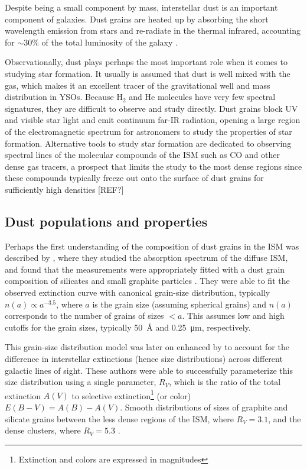 Despite being a small component by mass, interstellar dust is an important component of galaxies. Dust grains are heated up by absorbing the short wavelength emission from stars and re-radiate in the thermal infrared, accounting for $\sim 30\%$ of the total luminosity of the galaxy \citep{Mathis:1990jk}. 

Observationally, dust plays perhaps the most important role when it comes to studying star formation. It usually is assumed that dust is well mixed with the gas, which makes it an excellent tracer of the gravitational well and mass distribution in YSOs. Because H$_2$ and He molecules have very few spectral signatures, they are difficult to observe and study directly. Dust grains block UV and visible star light and emit continuum far-IR radiation, opening a large region of the electromagnetic spectrum for astronomers to study the properties of star formation. Alternative tools to study star formation are dedicated to observing spectral lines of the molecular compounds of the ISM such as CO and other dense gas tracers, a prospect that limits the study to the most dense regions since these compounds typically freeze out onto the surface of dust grains for sufficiently high densities [REF?]%


\subsection{Dust populations and properties}


Perhaps the first understanding of the composition of dust grains in the ISM was described by \citet{Mathis:1977hp}, where they studied the absorption spectrum of the diffuse ISM, and found that the measurements were appropriately fitted with a dust grain composition of silicates and small graphite particles \citep{Stecher:1965eq}. They were able to fit the observed extinction curve with canonical grain-size distribution, typically $n(a) \propto a^{-3.5}$, where $a$ is the grain size (assuming spherical grains) and $n(a)$ corresponds to the number of grains of sizes $<a$. This assumes low and high cutoffs for the grain sizes, typically \SI{50}{\angstrom} and \SI{0.25}{\micro\meter}, respectively.

This grain-size distribution model was later on enhanced by \citet{Cardelli:1989dp} to account for the difference in interstellar extinctions (hence size distributions) across different galactic lines of sight. These authors were able to successfully parameterize this size distribution using a single parameter, $R_V$, which is the ratio of the total extinction $A(V)$ to selective extinction\footnote{Extinction and colors are expressed in magnitudes} (or color) $E(B-V) = A(B) - A(V)$. Smooth distributions of sizes of graphite and silicate grains between the less dense regions of the ISM, where $R_V = 3.1$, and the dense clusters, where $R_V = 5.3$ \citep{Kim:1994iu}. 

